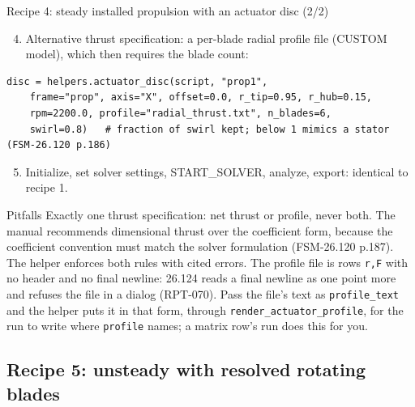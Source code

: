 \documentclass[aspectratio=169,10pt]{beamer}
\newcommand{\code}[1]{\texttt{\small #1}}
\begin{document}
\begin{frame}[fragile]{Recipe 4: steady installed propulsion with an actuator disc (2/2)}
  \begin{enumerate}
    \setcounter{enumi}{3}
    \item Alternative thrust specification: a per-blade radial profile file (CUSTOM model), which then requires the blade count:
  \end{enumerate}
\begin{lstlisting}
disc = helpers.actuator_disc(script, "prop1",
    frame="prop", axis="X", offset=0.0, r_tip=0.95, r_hub=0.15,
    rpm=2200.0, profile="radial_thrust.txt", n_blades=6,
    swirl=0.8)   # fraction of swirl kept; below 1 mimics a stator (FSM-26.120 p.186)
\end{lstlisting}
  \begin{enumerate}
    \setcounter{enumi}{4}
    \item Initialize, set solver settings, START\_SOLVER, analyze, export: identical to recipe 1.
  \end{enumerate}
  \begin{alertblock}{Pitfalls}
    Exactly one thrust specification: net thrust or profile, never both. The manual recommends dimensional thrust over the coefficient form, because the coefficient convention must match the solver formulation (FSM-26.120 p.187). The helper enforces both rules with cited errors. The profile file is rows \code{r,F} with no header and no final newline: 26.124 reads a final newline as one point more and refuses the file in a dialog (RPT-070). Pass the file's text as \code{profile\_text} and the helper puts it in that form, through \code{render\_actuator\_profile}, for the run to write where \code{profile} names; a matrix row's run does this for you.
  \end{alertblock}
\end{frame}

\subsection{Recipe 5: unsteady with resolved rotating blades}
\end{document}
